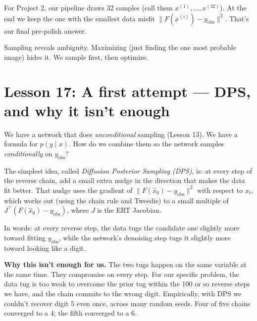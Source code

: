 \documentclass[11pt]{article}
\newcommand{\norm}[1]{\lVert #1 \rVert}
\begin{document}
For Project 2, our pipeline draws 32 samples (call them
$x^{(1)}, \ldots, x^{(32)}$). At the end we keep the one with the
smallest data misfit $\norm{F(x^{(i)}) - y_{\text{obs}}}^2$. That's our
final pre-polish answer.

\begin{intuition}
Sampling reveals ambiguity. Maximizing (just finding the one most
probable image) hides it. We sample first, then optimize.
\end{intuition}

\section{Lesson 17: A first attempt --- DPS, and why it isn't enough}

We have a network that does \emph{unconditional} sampling (Lesson 13).
We have a formula for $p(y \mid x)$. How do we combine them so the
network samples \emph{conditionally} on $y_{\text{obs}}$?

The simplest idea, called \emph{Diffusion Posterior Sampling (DPS)},
is: at every step of the reverse chain, add a small extra nudge in the
direction that makes the data fit better. That nudge uses the gradient
of $\norm{F(\hat x_0) - y_{\text{obs}}}^2$ with respect to $x_t$, which
works out (using the chain rule and Tweedie) to a small multiple of
$J^\top(F(\hat x_0) - y_{\text{obs}})$, where $J$ is the ERT Jacobian.

In words: at every reverse step, the data tugs the candidate one
slightly more toward fitting $y_{\text{obs}}$, while the network's
denoising step tugs it slightly more toward looking like a digit.

\textbf{Why this isn't enough for us.} The two tugs happen on the same
variable at the same time. They compromise on every step. For our
specific problem, the data tug is too weak to overcome the prior tug
within the 100 or so reverse steps we have, and the chain commits to
the wrong digit. Empirically, with DPS we couldn't recover digit 5 even
once, across many random seeds. Four of five chains converged to a 4;
the fifth converged to a 6.
\end{document}
